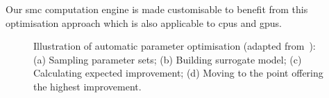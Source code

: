 Our \gls{smc} computation engine is made customisable to benefit from this optimisation approach which is also applicable to \glspl{cpu} and \glspl{gpu}. 

\setcounter{subfigure}{0}
\begin{figure}[t!]
\centering
{}
\caption{Illustration of automatic parameter optimisation (adapted from~\cite{kurek14fccm}): (a) Sampling parameter sets; (b) Building surrogate model; (c) Calculating expected improvement; (d) Moving to the point offering the highest improvement.}
\label{fig:dse}
\end{figure}


